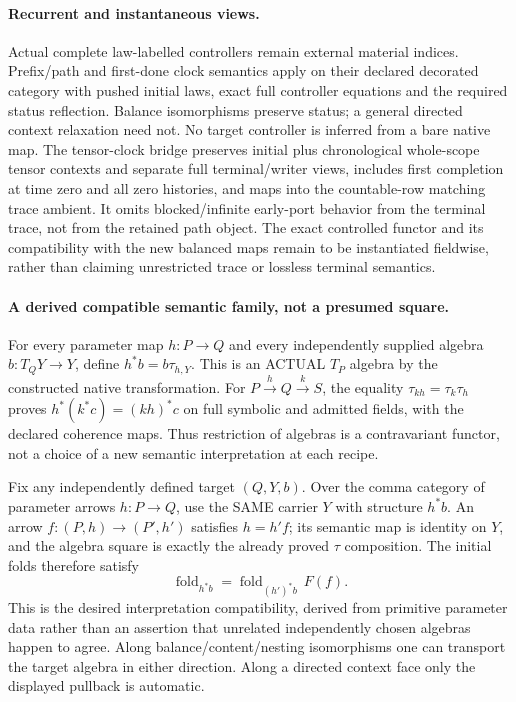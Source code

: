 \documentclass[11pt]{article}
\begin{document}
\paragraph{Recurrent and instantaneous views.}
Actual complete law-labelled controllers remain external material indices. Prefix/path and first-done clock semantics apply on their declared decorated category with pushed initial laws, exact full controller equations and the required status reflection. Balance isomorphisms preserve status; a general directed context relaxation need not. No target controller is inferred from a bare native map. The tensor-clock bridge preserves initial plus chronological whole-scope tensor contexts and separate full terminal/writer views, includes first completion at time zero and all zero histories, and maps into the countable-row matching trace ambient. It omits blocked/infinite early-port behavior from the terminal trace, not from the retained path object. The exact controlled functor and its compatibility with the new balanced maps remain to be instantiated fieldwise, rather than claiming unrestricted trace or lossless terminal semantics.

\paragraph{A derived compatible semantic family, not a presumed square.}
For every parameter map $h:P\to Q$ and every independently supplied algebra $b:T_QY\to Y$, define $h^*b=b\tau_{h,Y}$. This is an ACTUAL $T_P$ algebra by the constructed native transformation. For $P\xrightarrow hQ\xrightarrow kS$, the equality $\tau_{kh}=\tau_k\tau_h$ proves $h^*(k^*c)=(kh)^*c$ on full symbolic and admitted fields, with the declared coherence maps. Thus restriction of algebras is a contravariant functor, not a choice of a new semantic interpretation at each recipe.

Fix any independently defined target $(Q,Y,b)$. Over the comma category of parameter arrows $h:P\to Q$, use the SAME carrier $Y$ with structure $h^*b$. An arrow $f:(P,h)\to(P',h')$ satisfies $h=h'f$; its semantic map is identity on $Y$, and the algebra square is exactly the already proved $\tau$ composition. The initial folds therefore satisfy
\[
       \operatorname{fold}_{h^*b}
         =\operatorname{fold}_{(h')^*b}\,F(f).
\]
This is the desired interpretation compatibility, derived from primitive parameter data rather than an assertion that unrelated independently chosen algebras happen to agree. Along balance/content/nesting isomorphisms one can transport the target algebra in either direction. Along a directed context face only the displayed pullback is automatic.
\end{document}
